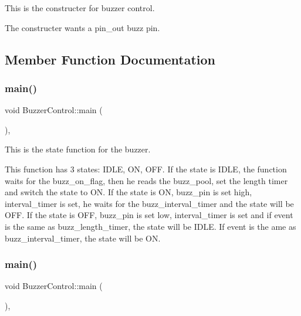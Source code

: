 This is the constructer for buzzer control. 

The constructer wants a pin\+\_\+out buzz pin. 

\subsection{Member Function Documentation}
\mbox{\label{class_buzzer_control_ae249e78ba5c0399e8b14091a0a8254eb}} 
\subsubsection{\texorpdfstring{main()}{main()}\hspace{0.1cm}{\footnotesize\ttfamily [1/2]}}
{\footnotesize\ttfamily void Buzzer\+Control\+::main (\begin{DoxyParamCaption}{ }\end{DoxyParamCaption})\hspace{0.3cm}{\ttfamily [inline]}, {\ttfamily [override]}}



This is the state function for the buzzer. 

This function has 3 states\+: I\+D\+LE, ON, O\+FF. If the state is I\+D\+LE, the function waits for the buzz\+\_\+on\+\_\+flag, then he reads the buzz\+\_\+pool, set the length timer and switch the state to ON. If the state is ON, buzz\+\_\+pin is set high, interval\+\_\+timer is set, he waits for the buzz\+\_\+interval\+\_\+timer and the state will be O\+FF. If the state is O\+FF, buzz\+\_\+pin is set low, interval\+\_\+timer is set and if event is the same as buzz\+\_\+length\+\_\+timer, the state will be I\+D\+LE. If event is the ame as buzz\+\_\+interval\+\_\+timer, the state will be ON. \mbox{\label{class_buzzer_control_ae249e78ba5c0399e8b14091a0a8254eb}} 
\subsubsection{\texorpdfstring{main()}{main()}\hspace{0.1cm}{\footnotesize\ttfamily [2/2]}}
{\footnotesize\ttfamily void Buzzer\+Control\+::main (\begin{DoxyParamCaption}{ }\end{DoxyParamCaption})\hspace{0.3cm}{\ttfamily [inline]}, {\ttfamily [override]}}



